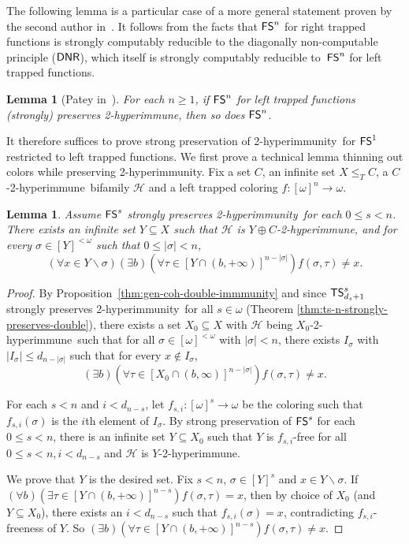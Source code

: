 \documentclass{amsart}
\newtheorem{lemma}[theorem]{Lemma}
\theoremstyle{definition}
\theoremstyle{remark}
\numberwithin{equation}{section}
\theoremstyle{noparens}
\def\propertyL{2-hyperimmunity}
\def\hyper{2-hyperimmune}
\def\mcal{\mathcal}
\newcommand{\Hcal}{\mathcal{H}}
\renewcommand{\setminus}{\smallsetminus}
\newcommand{\card}[1]{\left| #1 \right|}
\newcommand{\s}[1]{\ensuremath{\sf{#1}}}
\DeclareMathOperator{\dnr}{\s{DNR}}
\DeclareMathOperator{\ts}{\s{TS}}
\DeclareMathOperator{\fs}{\s{FS}}
\begin{document}
The following lemma is a particular case of a more general statement
proven by the second author in~\cite{PateyCombinatorial}.
It follows from the facts that $\fs^n$ for right trapped functions
is strongly computably reducible to the diagonally non-computable principle ($\dnr$),
which itself is strongly computably reducible to~$\fs^n$ for left trapped functions.

\begin{lemma}[Patey in~\cite{PateyCombinatorial}]\label{lem:avoidance-fs-trapped-to-untrapped}
For each $n \geq 1$, if $\fs^n$ for left trapped functions (strongly) preserves \hyper, then so does $\fs^n$.
\end{lemma}


It therefore suffices to prove strong preservation
of \propertyL\ for $\fs^1$ restricted to left trapped functions.
We first prove a technical lemma thinning out colors while preserving
\propertyL.
Fix a  set $C$, an infinite set $X\leq_T C$,
a $C$-\hyper\ bifamily $\Hcal$
and a left trapped coloring $f : [\omega]^n \to \omega$.
\begin{lemma}\label{lem:fs-cohesiveness-strong-preservation}
Assume $\fs^s$ strongly preserves \propertyL\ for each
  $0\leq s<n$.
There exists an infinite set  $Y\subseteq X$ such that $\Hcal$ is $Y \oplus C$-\hyper,
and for every $\sigma \in [Y]^{<\omega}$ such that $0 \leq \card{\sigma} < n$,
 $$
(\forall x \in Y \setminus \sigma)(\exists b)(\forall \tau \in [Y \cap (b, +\infty)]^{n-|\sigma|})
  f(\sigma, \tau) \neq x.
$$
\end{lemma}
\begin{proof}
 By Proposition~\ref{thm:gen-coh-double-immmunity}
 and since
 $\ts^s_{d_s+1}$ strongly preserves \propertyL\ for all  $s\in\omega$
 (Theorem \ref{thm:ts-n-strongly-preserves-double}), there exists a set
$X_0\subseteq X $ with $\mcal{H}$ being $  X_0$-\hyper\
 such that for all $\sigma\in [\omega]^{<\omega}$ with $|\sigma|<n$, there exists $I_\sigma$ with
$|I_\sigma|\leq d_{n-|\sigma|}$ such that for every $x\notin I_\sigma$,
$$
(\exists b)(\forall \tau\in [X_0\cap (b,\infty)]^{n-|\sigma|})
f(\sigma,\tau)\ne x.
$$

For each $s < n$ and $i < d_{n-s}$, let $f_{s,i} : [\omega]^s \to \omega$ be the coloring
such that $f_{s,i}(\sigma)$ is the  $i$th element of $I_\sigma$.
By strong preservation of $\fs^s$   for each
  $0\leq s<n$,
  there is an infinite
  set $Y\subseteq X_0$ such that $Y$ is $f_{s,i}$-free for all $0\leq s<n,i<d_{n-s}$
  and $\Hcal$ is $Y$-\hyper.

  We prove that $Y$ is the desired set.
   Fix $s < n$,   $\sigma \in [Y]^s$
   and $x \in Y \setminus \sigma$.
If $(\forall b)(\exists \tau \in [Y \cap (b, +\infty)]^{n - s})f(\sigma, \tau) = x$,
then by choice of $X_0$ (and $Y\subseteq X_0$), there exists an $i < d_{n - s}$ such that
$f_{s, i}(\sigma) = x$, contradicting $f_{s,i}$-freeness of $Y$.
So $(\exists b)(\forall \tau \in [Y \cap (b, +\infty)]^{n - s})f(\sigma, \tau) \neq x$.
\end{proof}
\end{document}
